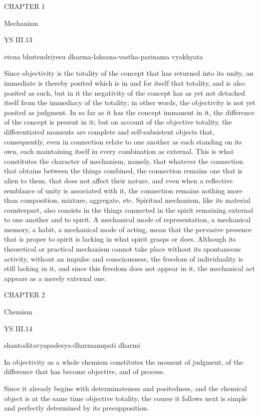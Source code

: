 CHAPTER 1

Mechanism

YS III.13

    etena bhutendriyesu dharma-laksana-vastha-parinama vyakhyata

Since objectivity is the totality of the concept
that has returned into its unity,
an immediate is thereby posited
which is in and for itself that totality,
and is also posited as such,
but in it the negativity of the concept has as yet
not detached itself from the immediacy of the totality;
in other words, the objectivity is not yet posited as judgment.
In so far as it has the concept immanent in it,
the difference of the concept is present in it;
but on account of the objective totality,
the differentiated moments are
complete and self-subsistent objects
that, consequently, even in connection
relate to one another as each standing on its own,
each maintaining itself in every combination as external.
This is what constitutes the character of mechanism,
namely, that whatever the connection that
obtains between the things combined,
the connection remains one that is alien to them,
that does not affect their nature,
and even when a reflective semblance
of unity is associated with it,
the connection remains nothing more than
composition, mixture, aggregate, etc.
Spiritual mechanism, like its material counterpart,
also consists in the things connected in the spirit
remaining external to one another and to spirit.
A mechanical mode of representation,
a mechanical memory, a habit, a mechanical mode of acting,
mean that the pervasive presence that is proper to spirit
is lacking in what spirit grasps or does.
Although its theoretical or practical mechanism
cannot take place without its spontaneous activity,
without an impulse and consciousness,
the freedom of individuality is still lacking in it,
and since this freedom does not appear in it,
the mechanical act appears as a merely external one.

CHAPTER 2

Chemism

YS III.14

    shantoditavyapadesya-dharmanupati dharmi

In objectivity as a whole
chemism constitutes the moment of judgment,
of the difference that has become objective,
and of process.

Since it already begins with
determinateness and positedness,
and the chemical object is
at the same time objective totality,
the course it follows next is
simple and perfectly determined
by its presupposition.

